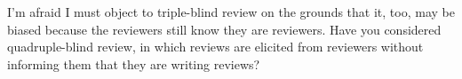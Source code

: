 \documentclass[12pt]{sigbovik-review}
\author{\textless mcoblenz@andrew.cmu.edu\textgreater}
\begin{document}
\maketitle

I’m afraid I must object to triple-blind review on the grounds that it, too, may be biased because the
reviewers still know they are reviewers. Have you considered quadruple-blind review, in which reviews are
elicited from reviewers without informing them that they are writing reviews?
\end{document}
